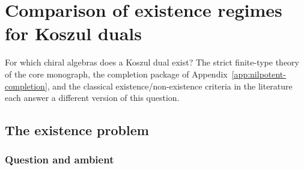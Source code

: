 
\chapter{Comparison of existence regimes for Koszul duals}
\label{app:existence-criteria}


For which chiral algebras does a Koszul dual exist? The strict
finite-type theory of the core monograph, the completion package of
Appendix~\ref{app:nilpotent-completion}, and the classical
existence/non-existence criteria in the literature each answer a
different version of this question.


\section{The existence problem}
\label{sec:existence-problem-statement}

\subsection{Question and ambient}

